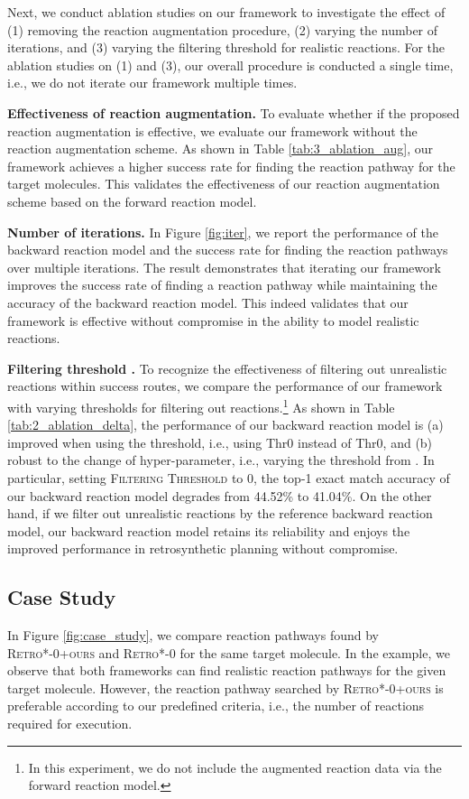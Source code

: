 Next, we conduct ablation studies on our framework to investigate the effect of (1) removing the reaction augmentation procedure, (2) varying the number of iterations, and (3) varying the filtering threshold  for realistic reactions. 
For the ablation studies on (1) and (3), our overall procedure is conducted a single time, i.e., we do not iterate our framework multiple times.


\textbf{Effectiveness of reaction augmentation.}
To evaluate whether if the proposed reaction augmentation is effective, we evaluate our framework without the reaction augmentation scheme. As shown in Table \ref{tab:3_ablation_aug}, our framework achieves a higher success rate for finding the reaction pathway for the target molecules. This validates the effectiveness of our reaction augmentation scheme based on the forward reaction model. 




\textbf{Number of iterations.} 
In Figure \ref{fig:iter}, we report the performance of the backward reaction model and the success rate for finding the reaction pathways over multiple iterations. The result demonstrates that iterating our framework improves the success rate of finding a reaction pathway while maintaining the accuracy of the backward reaction model. This indeed validates that our framework is effective without compromise in the ability to model realistic reactions.



\textbf{Filtering threshold .}
\label{ablation:filter}
To recognize the effectiveness of filtering out unrealistic reactions within success routes, we compare the performance of our framework with varying thresholds for filtering out reactions.\footnote{In this experiment, we do not include the augmented reaction data via the forward reaction model.} 
As shown in Table \ref{tab:2_ablation_delta}, the performance of our backward reaction model is (a) improved when using the threshold, i.e., using Thr0 instead of Thr0, and (b) robust to the change of hyper-parameter, i.e., varying the threshold from . In particular, setting \textsc{Filtering Threshold}  to 0, the top-1 exact match accuracy of our backward reaction model degrades from 44.52\% to 41.04\%. On the other hand, if we filter out unrealistic reactions by the reference backward reaction model, our backward reaction model retains its reliability and enjoys the improved performance in retrosynthetic planning without compromise.


\subsection{Case Study}
In Figure \ref{fig:case_study}, we compare reaction pathways found by \textsc{Retro*-0+ours} and \textsc{Retro*-0} for the same target molecule. In the example, we observe that both frameworks can find realistic reaction pathways for the given target molecule. However, the reaction pathway searched by \textsc{Retro*-0+ours} is preferable according to our predefined criteria, i.e., the number of reactions required for execution.